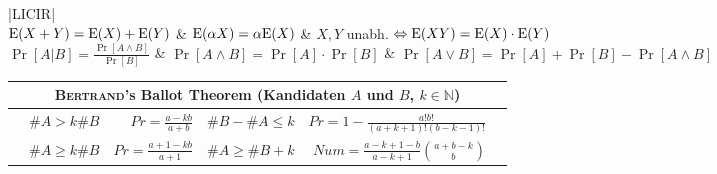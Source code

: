 \begin{tabularx}{\linewidth}{|LICIR|}
	\hline
	 \\
	\hline
	$\text{E}(X + Y) = \text{E}(X) + \text{E}(Y)$ &
	$\text{E}(\alpha X) = \alpha \text{E}(X)$ &
	$X, Y$ unabh. $\Leftrightarrow \text{E}(XY) = \text{E}(X) \cdot \text{E}(Y)$\\
	
	$\Pr[A \vert B] = \frac{\Pr[A \land B]}{\Pr[B]}$ &
	$\Pr[A \land B] = \Pr[A] \cdot \Pr[B]$ &
	$\Pr[A \lor B] = \Pr[A] + \Pr[B] - \Pr[A \land B]$ \\
	\hline
\end{tabularx}
\vfill
\begin{tabularx}{\linewidth}{|Xlr|lrX|}
	\hline
	\multicolumn{6}{|c|}{\textsc{Bertrand}'s Ballot Theorem (Kandidaten $A$ und $B$, $k \in \mathbb{N}$)} \\
	\hline
	& $\#A > k\#B$ & $Pr = \frac{a - kb}{a + b}$ &
	$\#B - \#A \leq k$ & $Pr = 1 - \frac{a!b!}{(a + k + 1)!(b - k - 1)!}$ & \\
	
	& $\#A \geq k\#B$ & $Pr = \frac{a + 1 - kb}{a + 1}$ &
	$\#A \geq \#B + k$ & $Num = \frac{a - k + 1 - b}{a - k + 1} \binom{a + b - k}{b}$ & \\
	\hline
\end{tabularx}

